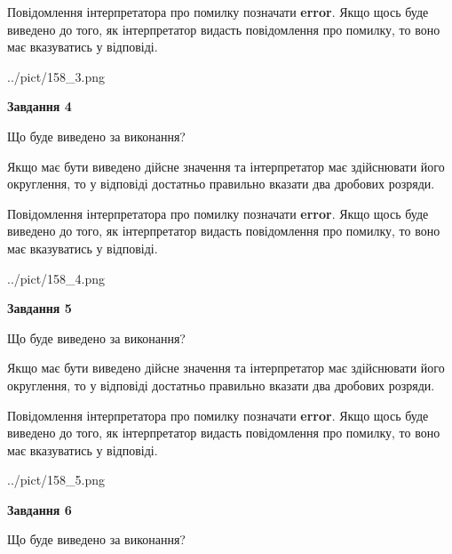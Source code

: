 \documentclass[12pt, ukrainian]{article}
\begin{document}
{\begin {Large}
Повідомлення інтерпретатора про помилку позначати \textbf{error}.
Якщо щось буде виведено до того, як інтерпретатор видасть повідомлення про помилку, 
то воно має вказуватись у відповіді. \par

\begin{center}
	{../pict/158_3.png}
\end{center}
\newpage

{\begin {center}\textbf{Завдання 4}\end {center}}\par
Що буде виведено за виконання? \par

Якщо має бути виведено дійсне значення та інтерпретатор має здійснювати його округлення, 
то у відповіді достатньо правильно вказати два дробових розряди.

Повідомлення інтерпретатора про помилку позначати \textbf{error}.
Якщо щось буде виведено до того, як інтерпретатор видасть повідомлення про помилку, 
то воно має вказуватись у відповіді. \par

\begin{center}
	{../pict/158_4.png}
\end{center}
\newpage

{\begin {center}\textbf{Завдання 5}\end {center}}\par
Що буде виведено за виконання? \par

Якщо має бути виведено дійсне значення та інтерпретатор має здійснювати його округлення, 
то у відповіді достатньо правильно вказати два дробових розряди.

Повідомлення інтерпретатора про помилку позначати \textbf{error}.
Якщо щось буде виведено до того, як інтерпретатор видасть повідомлення про помилку, 
то воно має вказуватись у відповіді. \par

\begin{center}
	{../pict/158_5.png}
\end{center}
\newpage

{\begin {center}\textbf{Завдання 6}\end {center}}\par
Що буде виведено за виконання? \par


\end{Large}}
\end{document}
